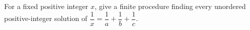 For a fixed positive integer $x$, give a finite procedure finding every unordered positive-integer solution of $\dfrac{1}{x}=\dfrac{1}{a}+\dfrac{1}{b}+\dfrac{1}{c}$.
